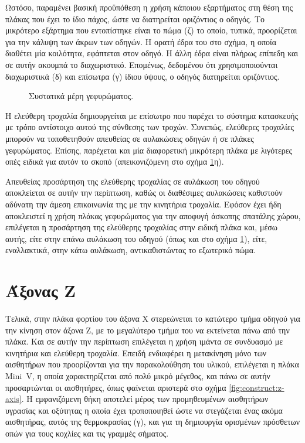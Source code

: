 Ωστόσο, παραμένει βασική προϋπόθεση η χρήση κάποιου εξαρτήματος στη θέση της
πλάκας που έχει το ίδιο πάχος, ώστε να διατηρείται οριζόντιος ο οδηγός. Το
μικρότερο εξάρτημα που εντοπίστηκε είναι το πώμα (ζ) το οποίο, τυπικά,
προορίζεται για την κάλυψη των άκρων των οδηγών. Η ορατή έδρα του στο σχήμα, η
οποία διαθέτει μία κοιλότητα, εφάπτεται στον οδηγό. Η άλλη έδρα είναι πλήρως
επίπεδη και σε αυτήν ακουμπά το διαχωριστικό. Επομένως, δεδομένου ότι
χρησιμοποιούνται διαχωριστικά (δ) και επίσωτρα (γ) ίδιου ύψους, ο οδηγός
διατηρείται οριζόντιος.

\begin{figure}
    \caption{Συστατικά μέρη γεφυρώματος. \label{fig:construct:x-axis-schem}}
    \begin{center}%
    \def\svgwidth{\textwidth}
    
    \end{center}
\end{figure}

Η ελεύθερη τροχαλία δημιουργείται με επίσωτρο που παρέχει το σύστημα κατασκευής
με τρόπο αντίστοιχο αυτού της σύνθεσης των τροχών. Συνεπώς, ελεύθερες τροχαλίες
μπορούν να τοποθετηθούν απευθείας σε αυλακώσεις οδηγών ή σε πλάκες γεφυρώματος.
Επίσης, παρέχεται και μία διαφορετική μικρότερη πλάκα με λιγότερες οπές ειδικά
για αυτόν το σκοπό (απεικονιζόμενη στο σχήμα \ref{fig:construct:x-axis-schem}η).

Απευθείας προσάρτηση της ελεύθερης τροχαλίας σε αυλάκωση του οδηγού αποκλείεται
σε αυτήν την περίπτωση, καθώς οι διαθέσιμες αυλακώσεις καθιστούν αδύνατη την
άμεση επικοινωνία της με την κινητήρια τροχαλία. Εφόσον έχει ήδη αποκλειστεί η
χρήση πλάκας γεφυρώματος για την αποφυγή άσκοπης σπατάλης χώρου, επιλέγεται η
προσάρτηση της ελεύθερης τροχαλίας στην ειδική πλάκα και, μέσω αυτής, είτε στην
επάνω αυλάκωση του οδηγού (όπως και στο σχήμα \ref{fig:construct:x-axis-schem}),
είτε, εναλλακτικά, στην κάτω αυλάκωση, αντικαθιστώντας το εξωτερικό πώμα.


\section{Άξονας Z}

\label{sec:construct:z-axis}
Τελικά, στην πλάκα φορτίου του άξονα X στερεώνεται το κατώτερο τμήμα οδηγού για
την κίνηση στον άξονα Z, με το μεγαλύτερο τμήμα του να εκτείνεται πάνω από την
πλάκα. Και σε αυτήν την περίπτωση επιλέγεται η χρήση ιμάντα σε συνδυασμό με
κινητήρια και ελεύθερη τροχαλία. Επειδή ενδιαφέρει η μετακίνηση μόνο των
αισθητήρων που προορίζονται για την παρακολούθηση του υλικού, επιλέγεται η πλάκα
Mini~V, η οποία χαρακτηρίζεται από πολύ μικρό μέγεθος, και πάνω σε αυτήν
προσαρτώνται οι αισθητήρες, όπως φαίνεται αριστερά στο σχήμα
\ref{fig:construct:z-axis}. Η εμφανιζόμενη θήκη αποτελεί μέρος των προμηθευμένων
αισθητήρων υγρασίας και οξύτητας η οποία έχει τροποποιηθεί ώστε να στεγάζεται
ένας ακόμα αισθητήρας, αυτός της θερμοκρασίας (γ), και για τη δημιουργία
ορισμένων πρόσθετων οπών για τους κοχλίες και τις γραμμές σήματος.

